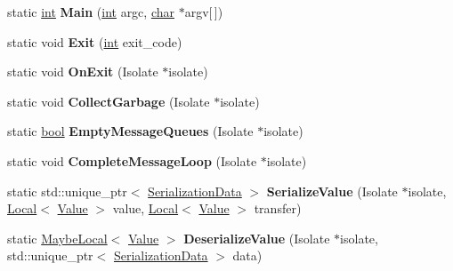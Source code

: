 \begin{DoxyCompactItemize}
\mbox{\label{classv8_1_1Shell_a057dfc36cac04373f5f6868b051be008}} 
static \mbox{\hyperlink{classint}{int}} {\bfseries Main} (\mbox{\hyperlink{classint}{int}} argc, \mbox{\hyperlink{classchar}{char}} $\ast$argv\mbox{[}$\,$\mbox{]})
\item 
\mbox{\label{classv8_1_1Shell_ac0d29ebee351c0948bcdd1f98ffd81aa}} 
static void {\bfseries Exit} (\mbox{\hyperlink{classint}{int}} exit\+\_\+code)
\item 
\mbox{\label{classv8_1_1Shell_a2d7f0ea798fb804ab288b801c2997449}} 
static void {\bfseries On\+Exit} (Isolate $\ast$isolate)
\item 
\mbox{\label{classv8_1_1Shell_ad46dde06dc1dbf8c048b6ad7c55686c9}} 
static void {\bfseries Collect\+Garbage} (Isolate $\ast$isolate)
\item 
\mbox{\label{classv8_1_1Shell_af8e2f54e646c0e31d1d9031306306084}} 
static \mbox{\hyperlink{classbool}{bool}} {\bfseries Empty\+Message\+Queues} (Isolate $\ast$isolate)
\item 
\mbox{\label{classv8_1_1Shell_a875287d47933d50a61041b4205ef1cd3}} 
static void {\bfseries Complete\+Message\+Loop} (Isolate $\ast$isolate)
\item 
\mbox{\label{classv8_1_1Shell_ad460c6d00a2acaa3d51a7a076ddd98d0}} 
static std\+::unique\+\_\+ptr$<$ \mbox{\hyperlink{classv8_1_1SerializationData}{Serialization\+Data}} $>$ {\bfseries Serialize\+Value} (Isolate $\ast$isolate, \mbox{\hyperlink{classv8_1_1Local}{Local}}$<$ \mbox{\hyperlink{classv8_1_1Value}{Value}} $>$ value, \mbox{\hyperlink{classv8_1_1Local}{Local}}$<$ \mbox{\hyperlink{classv8_1_1Value}{Value}} $>$ transfer)
\item 
\mbox{\label{classv8_1_1Shell_a23e9db916ab7fb980709bee587d431bb}} 
static \mbox{\hyperlink{classv8_1_1MaybeLocal}{Maybe\+Local}}$<$ \mbox{\hyperlink{classv8_1_1Value}{Value}} $>$ {\bfseries Deserialize\+Value} (Isolate $\ast$isolate, std\+::unique\+\_\+ptr$<$ \mbox{\hyperlink{classv8_1_1SerializationData}{Serialization\+Data}} $>$ data)
\item 
\mbox{\label{classv8_1_1Shell_a1a5dca359368270ebf13267e7161028b}} 

\end{DoxyCompactItemize}
